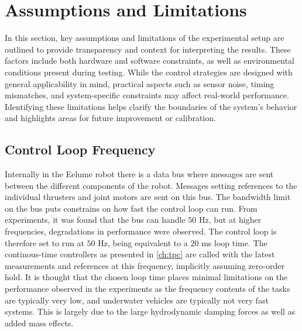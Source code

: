 \section{Assumptions and Limitations}
\label{sec:experimental_setup:assumptions_and_limitations}
In this section, key assumptions and limitations of the experimental setup are 
outlined to provide transparency and context for interpreting the results. 
These factors include both hardware and software constraints, as well as 
environmental conditions present during testing. While the control strategies 
are designed with general applicability in mind, practical aspects such as 
sensor noise, timing mismatches, and system-specific constraints may affect 
real-world performance. Identifying these limitations helps clarify the 
boundaries of the system's behavior and highlights areas for future 
improvement or calibration.

\subsection*{Control Loop Frequency}
Internally in the Eelume robot there is a data bus where messages are sent
between the different components of the robot. Messages setting references
to the individual thrusters and joint motors are sent on this bus. The bandwidth
limit on the bus puts constrains on how fast the control loop can run. From
experiments, it was found that the bus can handle \(50\) Hz, but at higher
frequencies, degradations in performance were observed. The control loop is
therefore set to run at \(50\) Hz, being equivalent to a \(20\) ms loop time.
The continous-time controllers as presented in \autoref{ch:tpc} are called with
the latest measurements and references at this frequency, implicitly assuming
zero-order hold.
It is thought that the chosen loop time places minimal limitations on the performance
observed in the experiments as the frequency contents of the tasks are typically
very low, and underwater vehicles are typically not very fast systems. This is
largely due to the large hydrodynamic damping forces as well as added mass effects.

